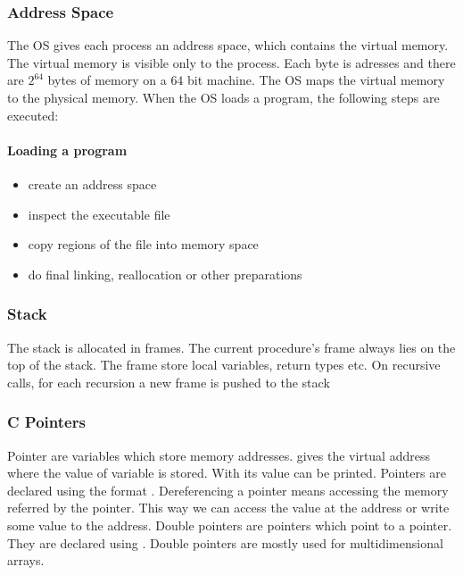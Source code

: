 

\subsubsection{Address Space}
The OS gives each process an address space, which contains the virtual memory. The virtual memory is visible only to the process. Each byte is adresses and there are $2^{64}$ bytes of memory on a $64$ bit machine. The OS maps the virtual memory to the physical memory.
When the OS loads a program, the following steps are executed:

\paragraph{Loading a program}
\begin{itemize}
    \item create an address space
    \item inspect the executable file
    \item copy regions of the file into memory space
    \item do final linking, reallocation or other preparations
\end{itemize}

\subsubsection{Stack}
The stack is allocated in frames. The current procedure's frame always lies on the top of the stack. The frame store local variables, return types etc. On recursive calls, for each recursion a new frame is pushed to the stack

\subsubsection{C Pointers}
Pointer are variables which store memory addresses.  gives the virtual address where the value of variable  is stored. With  its value can be printed. Pointers are declared using the format . Dereferencing a pointer means accessing the memory referred by the pointer. This way we can access the value at the address or write some value to the address. Double pointers are pointers which point to a pointer. They are declared using . Double pointers are mostly used for multidimensional arrays.

